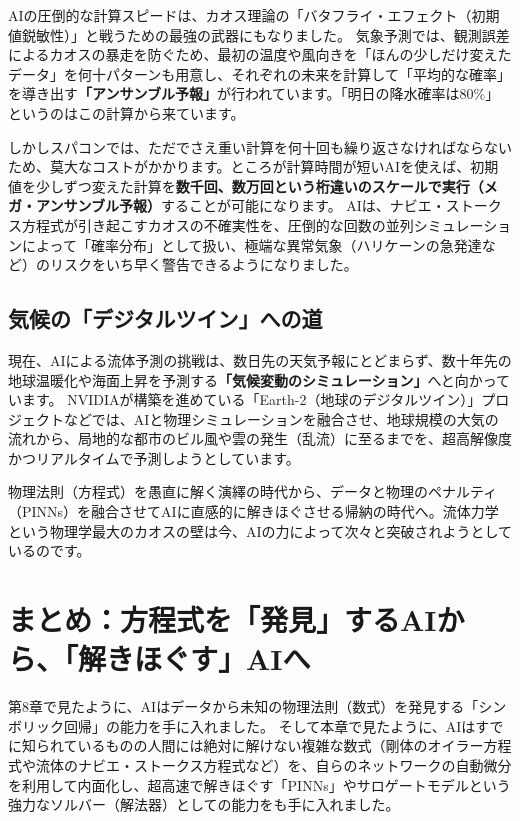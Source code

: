 AIの圧倒的な計算スピードは、カオス理論の「バタフライ・エフェクト（初期値鋭敏性）」と戦うための最強の武器にもなりました。 気象予測では、観測誤差によるカオスの暴走を防ぐため、最初の温度や風向きを「ほんの少しだけ変えたデータ」を何十パターンも用意し、それぞれの未来を計算して「平均的な確率」を導き出す\textbf{「アンサンブル予報」}が行われています。「明日の降水確率は80\%」というのはこの計算から来ています。

しかしスパコンでは、ただでさえ重い計算を何十回も繰り返さなければならないため、莫大なコストがかかります。ところが計算時間が短いAIを使えば、初期値を少しずつ変えた計算を\textbf{数千回、数万回という桁違いのスケールで実行（メガ・アンサンブル予報）}することが可能になります。 AIは、ナビエ・ストークス方程式が引き起こすカオスの不確実性を、圧倒的な回数の並列シミュレーションによって「確率分布」として扱い、極端な異常気象（ハリケーンの急発達など）のリスクをいち早く警告できるようになりました。

\subsection{気候の「デジタルツイン」への道}

現在、AIによる流体予測の挑戦は、数日先の天気予報にとどまらず、数十年先の地球温暖化や海面上昇を予測する\textbf{「気候変動のシミュレーション」}へと向かっています。 NVIDIAが構築を進めている「Earth-2（地球のデジタルツイン）」プロジェクトなどでは、AIと物理シミュレーションを融合させ、地球規模の大気の流れから、局地的な都市のビル風や雲の発生（乱流）に至るまでを、超高解像度かつリアルタイムで予測しようとしています。

物理法則（方程式）を愚直に解く演繹の時代から、データと物理のペナルティ（PINNs）を融合させてAIに直感的に解きほぐさせる帰納の時代へ。流体力学という物理学最大のカオスの壁は今、AIの力によって次々と突破されようとしているのです。

\section{まとめ：方程式を「発見」するAIから、「解きほぐす」AIへ}

第8章で見たように、AIはデータから未知の物理法則（数式）を発見する「シンボリック回帰」の能力を手に入れました。 そして本章で見たように、AIはすでに知られているものの人間には絶対に解けない複雑な数式（剛体のオイラー方程式や流体のナビエ・ストークス方程式など）を、自らのネットワークの自動微分を利用して内面化し、超高速で解きほぐす「PINNs」やサロゲートモデルという強力なソルバー（解法器）としての能力をも手に入れました。

